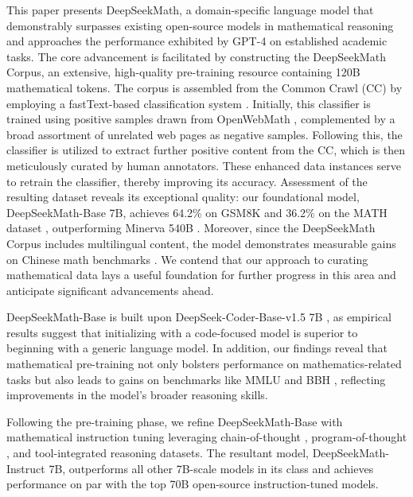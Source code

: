 This paper presents DeepSeekMath, a domain-specific language model that demonstrably surpasses existing open-source models in mathematical reasoning and approaches the performance exhibited by GPT-4 on established academic tasks. The core advancement is facilitated by constructing the DeepSeekMath Corpus, an extensive, high-quality pre-training resource containing 120B mathematical tokens. The corpus is assembled from the Common Crawl (CC) by employing a fastText-based classification system \citep{joulin2016fasttext}. Initially, this classifier is trained using positive samples drawn from OpenWebMath \citep{openwebmath}, complemented by a broad assortment of unrelated web pages as negative samples. Following this, the classifier is utilized to extract further positive content from the CC, which is then meticulously curated by human annotators. These enhanced data instances serve to retrain the classifier, thereby improving its accuracy. Assessment of the resulting dataset reveals its exceptional quality: our foundational model, DeepSeekMath-Base 7B, achieves 64.2\% on GSM8K \citep{gsm8k} and 36.2\% on the MATH dataset \citep{MATH}, outperforming Minerva 540B \citep{minerva}. Moreover, since the DeepSeekMath Corpus includes multilingual content, the model demonstrates measurable gains on Chinese math benchmarks \citep{wei2023cmath,agieval}. We contend that our approach to curating mathematical data lays a useful foundation for further progress in this area and anticipate significant advancements ahead.

DeepSeekMath-Base is built upon DeepSeek-Coder-Base-v1.5 7B \citep{deepseek-coder}, as empirical results suggest that initializing with a code-focused model is superior to beginning with a generic language model. In addition, our findings reveal that mathematical pre-training not only bolsters performance on mathematics-related tasks but also leads to gains on benchmarks like MMLU \citep{mmlu} and BBH \citep{bbh}, reflecting improvements in the model's broader reasoning skills.

Following the pre-training phase, we refine DeepSeekMath-Base with mathematical instruction tuning leveraging chain-of-thought \citep{cot}, program-of-thought \citep{pot,pal}, and tool-integrated reasoning \citep{tora} datasets. The resultant model, DeepSeekMath-Instruct 7B, outperforms all other 7B-scale models in its class and achieves performance on par with the top 70B open-source instruction-tuned models.

